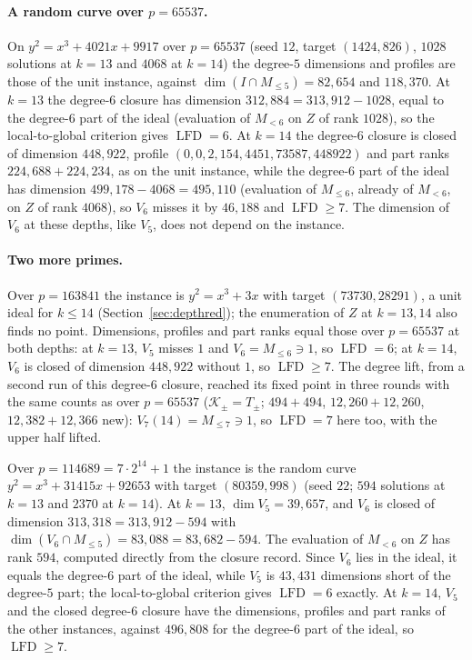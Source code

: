 \documentclass[11pt]{article}
\theoremstyle{definition}\newtheorem{definition}[theorem]{Definition}
\theoremstyle{remark}\newtheorem{remark}[theorem]{Remark}
\newcommand{\lfd}{\operatorname{LFD}}
\begin{document}
\paragraph{A random curve over $p=65537$.}
On $y^2=x^3+4021x+9917$ over $p=65537$ (seed $12$, target $(1424,826)$,
$1028$ solutions at $k=13$ and $4068$ at $k=14$) the degree-$5$ dimensions and
profiles are those of the unit instance, against
$\dim(I\cap M_{\le5})=82{,}654$ and $118{,}370$. At $k=13$ the degree-$6$
closure has dimension $312{,}884=313{,}912-1028$, equal to the degree-$6$ part
of the ideal (evaluation of $M_{<6}$ on $Z$ of rank $1028$), so the
local-to-global criterion gives $\lfd=6$. At $k=14$ the degree-$6$ closure is
closed of dimension $448{,}922$, profile $(0,0,2,154,4451,73587,448922)$ and
part ranks $224{,}688+224{,}234$, as on the unit instance, while the
degree-$6$ part of the ideal has dimension $499{,}178-4068=495{,}110$
(evaluation of $M_{\le6}$, already of $M_{<6}$, on $Z$ of rank $4068$), so
$V_6$ misses it by $46{,}188$ and $\lfd\ge7$. The dimension of $V_6$ at these
depths, like $V_5$, does not depend on the instance.

\paragraph{Two more primes.}
Over $p=163841$ the instance is $y^2=x^3+3x$ with target $(73730,28291)$, a
unit ideal for $k\le14$ (Section~\ref{sec:depthred}); the enumeration of $Z$
at $k=13,14$ also finds no point. Dimensions, profiles and part ranks equal
those over $p=65537$ at both depths: at $k=13$, $V_5$ misses $1$ and
$V_6=M_{\le6}\ni1$, so $\lfd=6$; at $k=14$, $V_6$ is closed of dimension
$448{,}922$ without $1$, so $\lfd\ge7$. The degree lift, from a second run of
this degree-$6$ closure, reached its fixed point in three rounds with the same
counts as over $p=65537$ ($\mathcal K_\pm=T_\pm$; $494+494$,
$12{,}260+12{,}260$, $12{,}382+12{,}366$ new): $V_7(14)=M_{\le7}\ni1$, so
$\lfd=7$ here too, with the upper half lifted.

Over $p=114689=7\cdot2^{14}+1$ the instance is the random curve
$y^2=x^3+31415x+92653$ with target $(80359,998)$ (seed $22$; $594$
solutions at $k=13$ and $2370$ at $k=14$). At $k=13$, $\dim V_5=39{,}657$,
and $V_6$ is closed of dimension $313{,}318=313{,}912-594$ with
$\dim(V_6\cap M_{\le5})=83{,}088=83{,}682-594$. The evaluation of $M_{<6}$
on $Z$ has rank $594$, computed directly from the closure record. Since $V_6$
lies in the ideal, it equals the degree-$6$ part of the ideal, while $V_5$
is $43{,}431$ dimensions short of the degree-$5$ part; the local-to-global
criterion gives $\lfd=6$ exactly. At $k=14$, $V_5$ and the closed degree-$6$
closure have the dimensions, profiles and part ranks of the other
instances, against $496{,}808$ for the degree-$6$ part of the ideal, so
$\lfd\ge7$.
\end{document}

